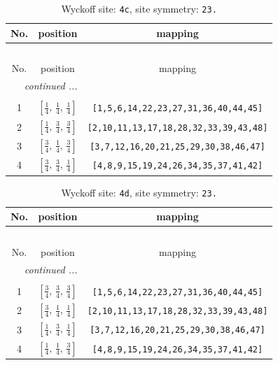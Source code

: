 \documentclass[fleqn,8pt]{jsarticle}
\begin{document}
\renewcommand{\arraystretch}{1.2}
\begin{longtable}{ccc}
\caption{Wyckoff site: {\tt 4c}, site symmetry: {\tt 23.}}
 \\
 \hline \hline
No. & position & mapping \\ \hline \endfirsthead

\multicolumn{2}{l}{\tablename\ \thetable{}} \\
 \hline \hline
No. & position & mapping \\ \hline \endhead

 \hline \hline
\multicolumn{2}{r}{\footnotesize\it continued ...} \\ \endfoot

 \hline \hline
\multicolumn{2}{r}{} \\ \endlastfoot

1 & $\left[ \frac{1}{4},\, \frac{1}{4},\, \frac{1}{4} \right]$ & {\tt [1,5,6,14,22,23,27,31,36,40,44,45]} \\ \hline
2 & $\left[ \frac{1}{4},\, \frac{3}{4},\, \frac{3}{4} \right]$ & {\tt [2,10,11,13,17,18,28,32,33,39,43,48]} \\ \hline
3 & $\left[ \frac{3}{4},\, \frac{1}{4},\, \frac{3}{4} \right]$ & {\tt [3,7,12,16,20,21,25,29,30,38,46,47]} \\ \hline
4 & $\left[ \frac{3}{4},\, \frac{3}{4},\, \frac{1}{4} \right]$ & {\tt [4,8,9,15,19,24,26,34,35,37,41,42]} \\
\end{longtable}
\renewcommand{\arraystretch}{1.2}
\begin{longtable}{ccc}
\caption{Wyckoff site: {\tt 4d}, site symmetry: {\tt 23.}}
 \\
 \hline \hline
No. & position & mapping \\ \hline \endfirsthead

\multicolumn{2}{l}{\tablename\ \thetable{}} \\
 \hline \hline
No. & position & mapping \\ \hline \endhead

 \hline \hline
\multicolumn{2}{r}{\footnotesize\it continued ...} \\ \endfoot

 \hline \hline
\multicolumn{2}{r}{} \\ \endlastfoot

1 & $\left[ \frac{3}{4},\, \frac{3}{4},\, \frac{3}{4} \right]$ & {\tt [1,5,6,14,22,23,27,31,36,40,44,45]} \\ \hline
2 & $\left[ \frac{3}{4},\, \frac{1}{4},\, \frac{1}{4} \right]$ & {\tt [2,10,11,13,17,18,28,32,33,39,43,48]} \\ \hline
3 & $\left[ \frac{1}{4},\, \frac{3}{4},\, \frac{1}{4} \right]$ & {\tt [3,7,12,16,20,21,25,29,30,38,46,47]} \\ \hline
4 & $\left[ \frac{1}{4},\, \frac{1}{4},\, \frac{3}{4} \right]$ & {\tt [4,8,9,15,19,24,26,34,35,37,41,42]} \\
\end{longtable}
\end{document}

